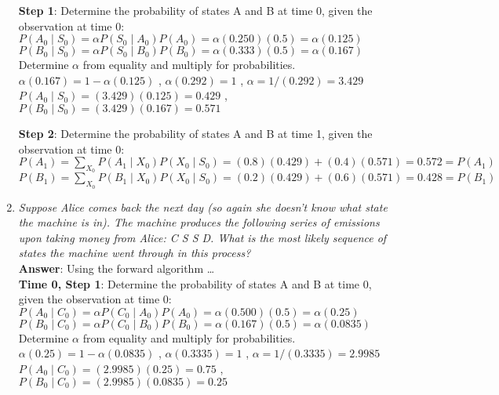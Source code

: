 \documentclass[fleqn]{hw8}
\begin{document}
\begin{enumerate}
\textbf{Step 1}: Determine the probability of states A and B at time 0, given the observation at time 0: \\
$\displaystyle P(A_0 \mid S_0) = \alpha P(S_0 \mid A_0)P(A_0) = \alpha (0.250)(0.5) = \alpha (0.125) $ \\
$\displaystyle P(B_0 \mid S_0) = \alpha P(S_0 \mid B_0)P(B_0) = \alpha (0.333)(0.5) = \alpha (0.167) $ \\
Determine $\alpha$ from equality and multiply for probabilities.\\
$\alpha (0.167) = 1 - \alpha (0.125) $ , $\alpha (0.292) = 1 $ , $\alpha = 1/(0.292) = 3.429 $ \\
$P(A_0 \mid S_0) = (3.429)(0.125) = 0.429 $ , $P(B_0 \mid S_0) = (3.429)(0.167) = 0.571$

\textbf{Step 2}: Determine the probability of states A and B at time 1, given the observation at time 0: \\
$\displaystyle P(A_1) = \sum_{X_0} P(A_1 \mid X_0)P(X_0 \mid S_0) = (0.8)(0.429) + (0.4)(0.571) = \boxed{0.572 = P(A_1)} $ \\
$\displaystyle P(B_1) = \sum_{X_0} P(B_1 \mid X_0)P(X_0 \mid S_0) = (0.2)(0.429) + (0.6)(0.571) = \boxed{0.428 = P(B_1)} $ \\

\item \textit{Suppose Alice comes back the next day (so again she doesn't know what state the machine is in).
  The machine produces the following series of emissions upon taking money from Alice: C S S D.  What is the most likely sequence of states the
  machine went through in this process?} \\
  
\textbf{Answer}: Using the forward algorithm \dots \\

\textbf{Time 0, Step 1}: Determine the probability of states A and B at time 0, given the observation at time 0: \\
$\displaystyle P(A_0 \mid C_0) = \alpha P(C_0 \mid A_0)P(A_0) = \alpha (0.500)(0.5) = \alpha (0.25) $ \\
$\displaystyle P(B_0 \mid C_0) = \alpha P(C_0 \mid B_0)P(B_0) = \alpha (0.167)(0.5) = \alpha (0.0835) $ \\
Determine $\alpha$ from equality and multiply for probabilities.\\
$\alpha (0.25) = 1 - \alpha (0.0835) $ , $\alpha (0.3335) = 1 $ , $\alpha = 1/(0.3335) = 2.9985 $ \\
$P(A_0 \mid C_0) = (2.9985)(0.25) = \mathbf{0.75} $ , $P(B_0 \mid C_0) = (2.9985)(0.0835) = \mathbf{0.25}$


\end{enumerate}
\end{document}
